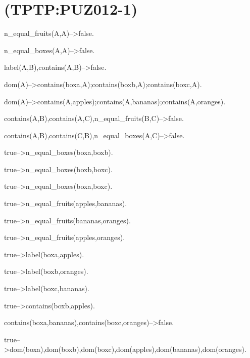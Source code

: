 \section{(TPTP:PUZ012-1)}



n_equal_fruits(A,A)-->false.

n_equal_boxes(A,A)-->false.

label(A,B),contains(A,B)-->false.

dom(A)-->contains(boxa,A);contains(boxb,A);contains(boxc,A).

dom(A)-->contains(A,apples);contains(A,bananas);contains(A,oranges).

contains(A,B),contains(A,C),n_equal_fruits(B,C)-->false.

contains(A,B),contains(C,B),n_equal_boxes(A,C)-->false.

true-->n_equal_boxes(boxa,boxb).

true-->n_equal_boxes(boxb,boxc).

true-->n_equal_boxes(boxa,boxc).

true-->n_equal_fruits(apples,bananas).

true-->n_equal_fruits(bananas,oranges).

true-->n_equal_fruits(apples,oranges).

true-->label(boxa,apples).

true-->label(boxb,oranges).

true-->label(boxc,bananas).

true-->contains(boxb,apples).

contains(boxa,bananas),contains(boxc,oranges)-->false.

true-->dom(boxa),dom(boxb),dom(boxc),dom(apples),dom(bananas),dom(oranges).

\newline
